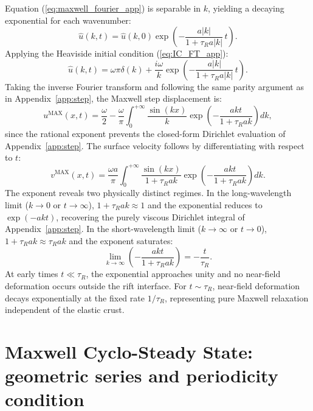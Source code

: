 \documentclass[12pt]{article}
\begin{document}
Equation (\ref{eq:maxwell_fourier_app}) is separable in $k$, yielding a decaying
exponential for each wavenumber:
\begin{equation}
\hat{u}(k,t) = \hat{u}(k,0)\exp\!\left(-\frac{a|k|}{1+\tau_R a|k|}\,t\right).
\end{equation}
Applying the Heaviside initial condition (\ref{eq:IC_FT_app}):
\begin{equation}
\hat{u}(k,t) = \omega\pi\delta(k)
  + \frac{i\omega}{k}\exp\!\left(-\frac{a|k|}{1+\tau_R a|k|}\,t\right).
\end{equation}
Taking the inverse Fourier transform and following the same parity argument as
in Appendix~\ref{app:step}, the Maxwell step displacement is:
\begin{equation}
u^{\text{MAX}}(x,t) = \frac{\omega}{2}
  - \frac{\omega}{\pi}\int_0^{+\infty}
    \frac{\sin(kx)}{k}\exp\!\left(-\frac{akt}{1+\tau_R ak}\right)dk,
\end{equation}
since the rational exponent prevents the closed-form Dirichlet evaluation of
Appendix~\ref{app:step}. The surface velocity follows by differentiating with
respect to $t$:
\begin{equation}
v^{\text{MAX}}(x,t) = \frac{\omega a}{\pi}\int_0^{+\infty}
  \frac{\sin(kx)}{1+\tau_R ak}
  \exp\!\left(-\frac{akt}{1+\tau_R ak}\right)dk.
\end{equation}
The exponent reveals two physically distinct regimes. In the long-wavelength
limit ($k\to 0$ or $t\to\infty$), $1+\tau_R ak \approx 1$ and the exponential
reduces to $\exp(-akt)$, recovering the purely viscous Dirichlet integral of
Appendix~\ref{app:step}. In the short-wavelength limit ($k\to\infty$ or
$t\to 0$), $1+\tau_R ak \approx \tau_R ak$ and the exponent saturates:
\begin{equation}
\lim_{k\to\infty}\left(-\frac{akt}{1+\tau_R ak}\right) = -\frac{t}{\tau_R}.
\end{equation}
At early times $t\ll\tau_R$, the exponential approaches unity and no near-field
deformation occurs outside the rift interface. For $t\sim\tau_R$, near-field
deformation decays exponentially at the fixed rate $1/\tau_R$, representing
pure Maxwell relaxation independent of the elastic crust.

\section{Maxwell Cyclo-Steady State: geometric series and periodicity condition}
\label{app:maxwell_css}
\end{document}
